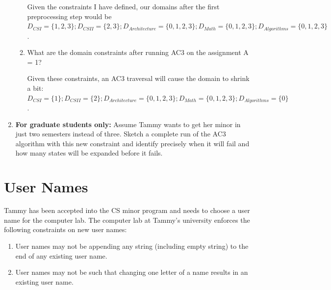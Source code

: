 \documentclass[12pt]{article}
\begin{document}
\begin{enumerate}
\begin{enumerate}
\begin{solution}
Given the constraints I have defined, our domains after the first preprocessing step would be $D_{CS I} = \{ 1, 2, 3 \}; D_{CS II} = \{ 2, 3 \}; D_{Architecture} = \{ 0, 1, 2, 3 \}; D_{Math} = \{0, 1, 2, 3 \}; D_{Algorithms} = \{ 0, 1, 2, 3 \}$.
\end{solution}
  
  \item What are the domain constraints after running AC3 on the
    assignment A = 1?

\begin{solution}
Given these constraints, an AC3 traversal will cause the domain to shrink a bit: $D_{CS I} = \{ 1 \}; D_{CS II} = \{ 2 \}; D_{Architecture} = \{ 0, 1, 2, 3 \}; D_{Math} = \{0, 1, 2, 3 \}; D_{Algorithms} = \{ 0 \}$.
\end{solution}
  
  \end{enumerate}

\item {\bf For graduate students only:} Assume Tammy wants to get her
  minor in just two semesters instead of three. Sketch a complete run
  of the AC3 algorithm with this new constraint and identify precisely
  when it will fail and how many states will be expanded before it
  fails.


\end{enumerate}

\section{User Names}

Tammy has been accepted into the CS minor program and needs to choose
a user name for the computer lab. The computer lab at Tammy's
university enforces the following constraints on new user names:

\begin{enumerate}

\item User names may not be appending any string (including empty string) to the end of any existing user name.

\item User names may not be such that changing one letter of a name
  results in an existing user name.

\end{enumerate}
\end{document}

